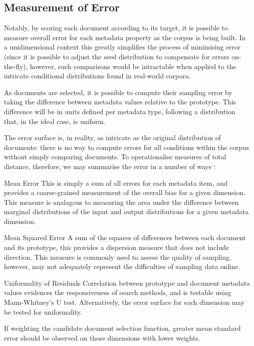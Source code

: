 \subsection{Measurement of Error}
\label{sec:rebuilding:method:errormeasure}
Notably, by scoring each document according to its target, it is possible to measure overall error for each metadata property as the corpus is being built.  In a unidimensional context this greatly simplifies the process of minimising error (since it is possible to adjust the seed distribution to compensate for errors on-the-fly), however, such comparisons would be intractable when applied to the intricate conditional distributions found in real-world corpora.



As documents are selected, it is possible to compute their sampling error by taking the difference between metadata values relative to the prototype.  This difference will be in units defined per metadata type, following a distribution that, in the ideal case, is uniform.

The error surface is, in reality, as intricate as the original distribution of documents: there is no way to compute errors for all conditions within the corpus without simply comparing documents.  To operationalise measures of total distance, therefore, we may summarise the error in a number of ways :

\begin{itemizeTitle}

    \item[Mean Error] This is simply a sum of all errors for each metadata item, and provides a coarse-grained measurement of the overall bias for a given dimension.  This measure is analagous to measuring the area under the difference between marginal distributions of the input and output distributions for a given metadata dimension.

    \item[Mean Squared Error] A sum of the squares of differences between each document and its prototype, this provides a dispersion measure that does not include direction.  This measure is commonly used to assess the quality of sampling, however, may not adequately represent the difficulties of sampling data online.

    \item[Uniformality of Residuals] Correlation between prototype and document metadata values evidences the responsiveness of search methods, and is testable using Mann-Whitney's U test.  Alternatively, the error surface for each dimension may be tested for uniformality.

\end{itemizeTitle}



If weighting the candidate document selection function, greater mean standard error should be observed on those dimensions with lower weights.








